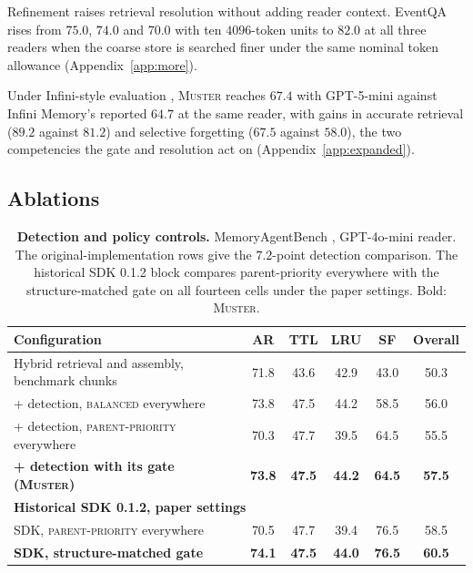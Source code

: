 \documentclass{article}
\newcommand{\ours}{\rowcolor{oursbg}}
\newcommand{\tabfont}{\fontsize{7.5}{8.5}\selectfont\renewcommand{\arraystretch}{1.0}}
\newcommand{\sys}{\textsc{Muster}}
\newcommand{\balanced}{\textsc{balanced}}
\newcommand{\parprio}{\textsc{parent-priority}}
\begin{document}
Refinement raises retrieval resolution without adding reader context. EventQA rises from $75.0$, $74.0$ and $70.0$ with ten $4096$-token units to $82.0$ at all three readers when the coarse store is searched finer under the same nominal token allowance (Appendix~\ref{app:more}).

Under Infini-style evaluation \cite{infini}, \sys{} reaches $67.4$ with GPT-5-mini against Infini Memory's reported $64.7$ at the same reader, with gains in accurate retrieval ($89.2$ against $81.2$) and selective forgetting ($67.5$ against $58.0$), the two competencies the gate and resolution act on (Appendix~\ref{app:expanded}).

\subsection{Ablations}\label{sec:ablations}

\begin{table}[t]
\centering\tabfont
\caption{\textbf{Detection and policy controls.} MemoryAgentBench \cite{mab}, GPT-4o-mini \cite{gpt4omini} reader. The original-implementation rows give the $7.2$-point detection comparison. The historical SDK 0.1.2 block compares parent-priority everywhere with the structure-matched gate on all fourteen cells under the paper settings. Bold: \sys{}.}
\label{tab:gate}
\setlength{\tabcolsep}{3pt}\setlength{\aboverulesep}{0pt}\setlength{\belowrulesep}{0pt}\setlength{\extrarowheight}{0.8pt}
\begin{tabular}{l*{5}{c}}
\toprule
Configuration & AR & TTL & LRU & SF & Overall \\
\midrule
Hybrid retrieval and assembly, benchmark chunks & 71.8 & 43.6 & 42.9 & 43.0 & 50.3 \\
\midrule
+ detection, \balanced{} everywhere & 73.8 & 47.5 & 44.2 & 58.5 & 56.0 \\
+ detection, \parprio{} everywhere & 70.3 & 47.7 & 39.5 & 64.5 & 55.5 \\
\midrule
\ours \textbf{+ detection with its gate (\sys{})} & \textbf{73.8} & \textbf{47.5} & \textbf{44.2} & \textbf{64.5} & \textbf{57.5} \\
\midrule[\heavyrulewidth]
\multicolumn{6}{l}{\textbf{Historical SDK 0.1.2, paper settings}}\\
SDK, \parprio{} everywhere & 70.5 & 47.7 & 39.4 & 76.5 & 58.5 \\
\ours \textbf{SDK, structure-matched gate} & \textbf{74.1} & \textbf{47.5} & \textbf{44.0} & \textbf{76.5} & \textbf{60.5} \\
\bottomrule
\end{tabular}
\end{table}
\end{document}

